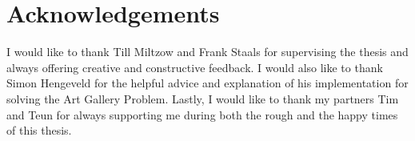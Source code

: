 \section*{Acknowledgements}
I would like to thank Till Miltzow and Frank Staals for supervising the thesis and always offering creative and constructive feedback. I would also like to thank Simon Hengeveld for the helpful advice and explanation of his implementation for solving the Art Gallery Problem.
Lastly, I would like to thank my partners Tim and Teun for always supporting me during both the rough and the happy times of this thesis.
